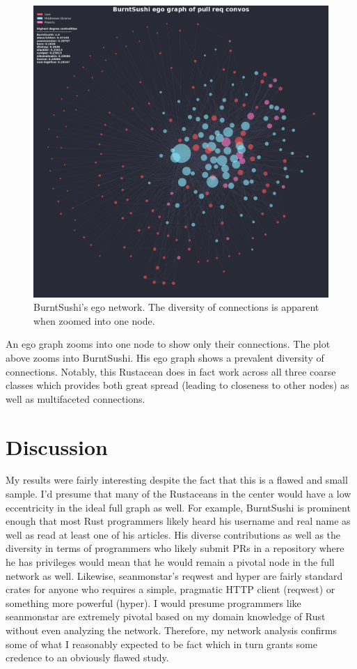 \documentclass[12pt, a4paper]{article}
\begin{document}
\begin{figure}[ht!]
    \includegraphics[width=\linewidth]{network_ego_degcent.png}
    \caption{BurntSushi's ego network. The diversity of connections is apparent when zoomed into one node.}
    \label{fig:burntego}
\end{figure}

An ego graph zooms into one node to show only their connections. The plot above zooms into BurntSushi. His ego graph shows a prevalent diversity of connections. Notably, this Rustacean does in fact work across all three coarse classes which provides both great spread (leading to closeness to other nodes) as well as multifaceted connections.

\section{Discussion}
My results were fairly interesting despite the fact that this is a flawed and small sample. I'd presume that many of the Rustaceans in the center would have a low eccentricity in the ideal full graph as well. For example, BurntSushi is prominent enough that most Rust programmers likely heard his username and real name as well as read at least one of his articles. His diverse contributions as well as the diversity in terms of programmers who likely submit PRs in a repository where he has privileges would mean that he would remain a pivotal node in the full network as well. Likewise, seanmonstar's reqwest and hyper are fairly standard crates for anyone who requires a simple, pragmatic HTTP client (reqwest) or something more powerful (hyper). I would presume programmers like seanmonstar are extremely pivotal based on my domain knowledge of Rust without even analyzing the network. Therefore, my network analysis confirms some of what I reasonably expected to be fact which in turn grants some credence to an obviously flawed study.
\end{document}
